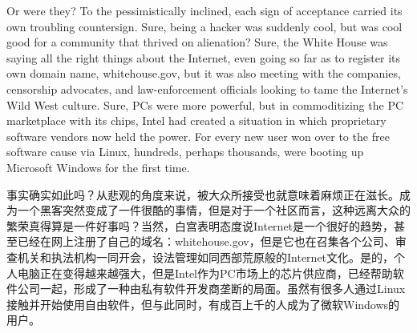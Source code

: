 \ifdefined\eng
Or were they? To the pessimistically inclined, each sign of acceptance carried its own troubling countersign. Sure, being a hacker was suddenly cool, but was cool good for a community that thrived on alienation? Sure, the White House was saying all the right things about the Internet, even going so far as to register its own domain name, whitehouse.gov, but it was also meeting with the companies, censorship advocates, and law-enforcement officials looking to tame the Internet's Wild West culture. Sure, PCs were more powerful, but in commoditizing the PC marketplace with its chips, Intel had created a situation in which proprietary software vendors now held the power. For every new user won over to the free software cause via Linux, hundreds, perhaps thousands, were booting up Microsoft Windows for the first time.
\fi

\ifdefined\chs
事实确实如此吗？从悲观的角度来说，被大众所接受也就意味着麻烦正在滋长。成为一个黑客突然变成了一件很酷的事情，但是对于一个社区而言，这种远离大众的繁荣真得算是一件好事吗？当然，白宫表明态度说Internet是一个很好的趋势，甚至已经在网上注册了自己的域名：whitehouse.gov，但是它也在召集各个公司、审查机关和执法机构一同开会，设法管理如同西部荒原般的Internet文化。是的，个人电脑正在变得越来越强大，但是Intel作为PC市场上的芯片供应商，已经帮助软件公司一起，形成了一种由私有软件开发商垄断的局面。虽然有很多人通过Linux接触并开始使用自由软件，但与此同时，有成百上千的人成为了微软Windows的用户。
\fi




